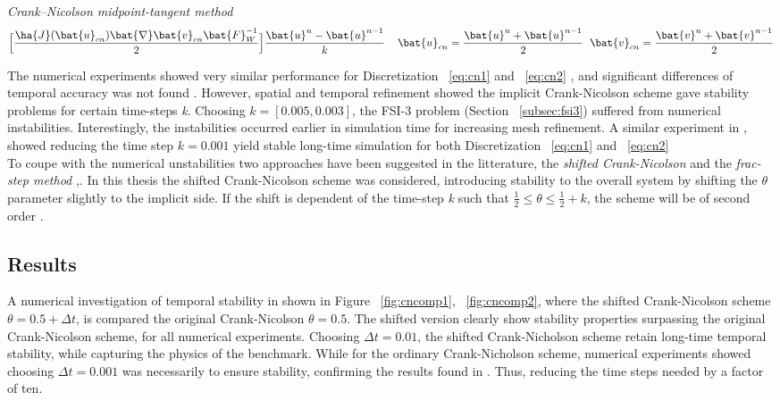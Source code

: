\begin{discr}
\textit{Crank–Nicolson midpoint-tangent method}
\begin{align*}
\Big[\frac{\ha{J}(\bat{u}_{cn}) \bat{\nabla} \bat{v}_{cn} \bat{F}_W^{-1}}{2} \Big] 
\frac{\bat{u}^{n} - \bat{u}^{n-1}}{k} \hspace{4mm}
\bat{u}_{cn} = \frac{\bat{u}^{n} + \bat{u}^{n-1}}{2} \hspace{2mm}
\bat{v}_{cn} = \frac{\bat{v}^{n} + \bat{v}^{n-1}}{2}
\end{align*} 
\label{eq:cn2}
\end{discr}

\newpage

The numerical experiments showed very similar performance for Discretization  ~\ref{eq:cn1} and ~\ref{eq:cn2} , and significant differences of temporal accuracy was not found \cite{Richter2015}. However, spatial and temporal refinement showed the implicit Crank-Nicolson scheme gave stability problems for certain time-steps \textit{k}. Choosing $k = [0.005, 0.003]$, the FSI-3 problem (Section  ~\ref{subsec:fsi3}) suffered from numerical instabilities. Interestingly, the instabilities occurred earlier in simulation time for increasing mesh refinement. A similar experiment in  \cite{Wicka}, showed reducing the time step $k = 0.001$  yield stable long-time simulation for both  Discretization  ~\ref{eq:cn1} and ~\ref{eq:cn2}    \\

To coupe with the numerical unstabilities two approaches have been suggested in the litterature,  the \textit{shifted Crank-Nicolson}  and the \textit{frac-step method}  \cite{Richter2015, Wicka, Wick2013a},.  In this thesis the shifted Crank-Nicolson scheme was considered, introducing stability to the overall system by shifting the $\theta$ parameter slightly to the implicit side. If the shift is dependent of the time-step \textit{k} such that $\frac{1}{2} \leq \theta \leq \frac{1}{2} + k$, the scheme will be of second order \cite{Richter2015}. \\

\subsection{Results}
A numerical investigation of temporal stability in shown in Figure ~\ref{fig:cncomp1}, ~\ref{fig:cncomp2}, where the shifted Crank-Nicolson scheme $\theta = 0.5 + \Delta t$, is compared the original Crank-Nicolson $\theta = 0.5$. The shifted version clearly show stability properties surpassing the original Crank-Nicolson  scheme, for all numerical experiments. Choosing $\Delta t = 0.01$, the shifted Crank-Nicholson scheme retain long-time temporal stability, while capturing the physics of the benchmark. While for the ordinary Crank-Nicholson scheme, numerical experiments showed choosing $\Delta t = 0.001$ was necessarily to ensure stability, confirming the results found in \cite{Wicka}. Thus, reducing the time steps needed by a factor of ten. \\

